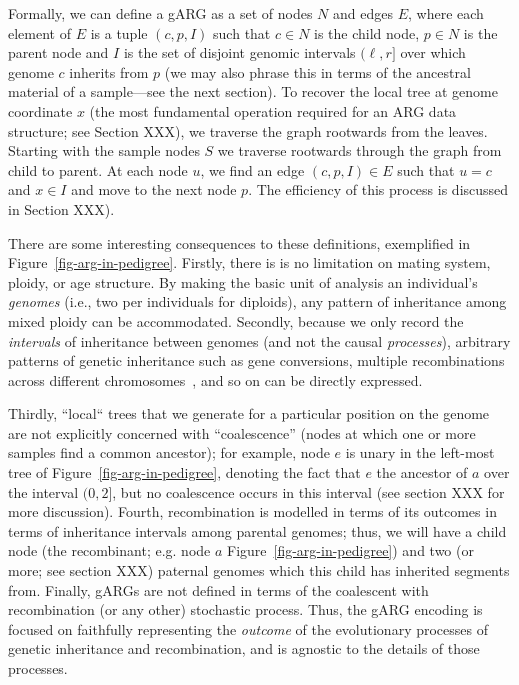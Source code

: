 \documentclass{article}
\begin{document}
Formally, we can define a gARG as a set of nodes $N$ and edges $E$, where each
element of $E$ is a tuple $(c, p, I)$ such that
$c\in N$ is the child node, $p\in N$ is the parent node and $I$ is the set of
disjoint genomic intervals $(\ell, r]$ over which genome $c$ inherits from $p$ (we may
also phrase this in terms of the ancestral material of a sample---see
the next section).
To recover the local tree at genome coordinate $x$ (the most
fundamental operation required for an ARG data structure; see
Section XXX),
we traverse the graph rootwards from the leaves.
Starting with the sample nodes $S$ we traverse
rootwards through the graph from child to parent. At each node $u$, we find an
edge $(c, p, I) \in E$ such that $u = c$ and $x \in I$
and move to the next node $p$. The efficiency of this process is discussed
in Section XXX).

There are some interesting consequences to these definitions, exemplified
in Figure~\ref{fig-arg-in-pedigree}. Firstly,
there is
is no limitation on mating system, ploidy, or age structure. By making the
basic unit of analysis an individual's \emph{genomes} (i.e., two per individuals
for diploids), any pattern of inheritance among mixed ploidy can be
accommodated.
Secondly, because we only record the \emph{intervals} of inheritance
between genomes (and not the causal \emph{processes}),
arbitrary patterns of genetic inheritance such as
gene conversions,
multiple recombinations
across different chromosomes~\citep{fearnhead2003ancestral,koskela2019robust},
and so on can be directly expressed.

Thirdly, ``local`` trees that we generate for a particular position on the
genome are not explicitly concerned with ``coalescence'' (nodes at which
one or more samples find a common ancestor); for example, node $e$
is unary in the left-most tree of Figure~\ref{fig-arg-in-pedigree},
denoting the fact that $e$ the ancestor of $a$ over the interval $(0, 2]$,
but no coalescence occurs in this interval (see section XXX for more
discussion). Fourth, recombination is modelled in terms of
its outcomes in terms of inheritance intervals among parental genomes;
thus, we will have a child node (the recombinant; e.g. node $a$
Figure~\ref{fig-arg-in-pedigree}) and two (or more; see section XXX)
paternal genomes which this child has inherited segments from.
Finally, gARGs are not defined in terms of the
coalescent with recombination (or any other) stochastic process.
Thus, the gARG encoding is focused on faithfully representing the
\emph{outcome} of the evolutionary processes of genetic inheritance and
recombination, and is agnostic to the details of those processes.
\end{document}

